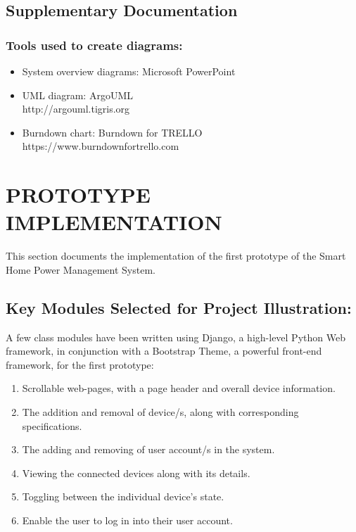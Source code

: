 \documentclass[10pt,twocolumn]{witseiepaper}
\begin{document}
	
	\subsection{Supplementary Documentation}
	\subsubsection{Tools used to create diagrams:}
	\begin{itemize}
		\item System overview diagrams: Microsoft PowerPoint
		\item UML diagram: ArgoUML\\http://argouml.tigris.org
		\item Burndown chart: Burndown for TRELLO\\https://www.burndownfortrello.com
	\end{itemize}
	
	\section{PROTOTYPE IMPLEMENTATION}
	
	This section documents the implementation of the first prototype of the Smart Home Power Management System. 	
	
	\subsection{Key Modules Selected for Project Illustration:}
	A few class modules have been written using Django, a high-level Python Web framework, in conjunction with a Bootstrap Theme, a powerful front-end framework, for the first prototype: 
	\begin{enumerate}
		\item Scrollable web-pages, with a page header and overall device information.
		\item The addition and removal of device/s, along with corresponding specifications.
		\item The adding and removing of user account/s in the system.
		\item Viewing the connected devices along with its details.
		\item Toggling between the individual device's state.
		\item Enable the user to log in into their user account.
	\end{enumerate}
	
\end{document}
